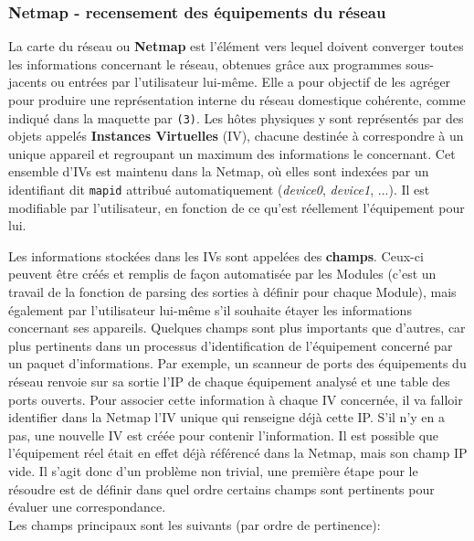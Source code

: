 \documentclass[]{article}
\begin{document}
\newpage

\subsubsection{Netmap - recensement des équipements du réseau}

La carte du réseau ou \textbf{Netmap} est l'élément vers lequel doivent converger toutes les informations concernant le réseau, obtenues grâce aux programmes sous-jacents ou entrées par l'utilisateur lui-même. Elle a pour objectif de les agréger pour produire une représentation interne du réseau domestique cohérente, comme indiqué dans la maquette par \texttt{(3)}. Les hôtes physiques y sont représentés par des objets appelés \textbf{Instances Virtuelles} (IV), chacune destinée à correspondre à un unique appareil et regroupant un maximum des informations le concernant. Cet ensemble d'IVs est maintenu dans la Netmap, où elles sont indexées par un identifiant dit \texttt{mapid} attribué automatiquement (\textit{device0}, \textit{device1}, ...). Il est modifiable par l'utilisateur, en fonction de ce qu'est réellement l'équipement pour lui.\\

\par Les informations stockées dans les IVs sont appelées des \textbf{champs}. Ceux-ci peuvent être créés et remplis de façon automatisée par les Modules (c'est un travail de la fonction de parsing des sorties à définir pour chaque Module), mais également par l'utilisateur lui-même s'il souhaite étayer les informations concernant ses appareils. Quelques champs sont plus importants que d'autres, car plus pertinents dans un processus d'identification de l'équipement concerné par un paquet d'informations. Par exemple, un scanneur de ports des équipements du réseau renvoie sur sa sortie l'IP de chaque équipement analysé et une table des ports ouverts. Pour associer cette information à chaque IV concernée, il va falloir identifier dans la Netmap l'IV unique qui renseigne déjà cette IP. S'il n'y en a pas, une nouvelle IV est créée pour contenir l'information. Il est possible que l'équipement réel était en effet déjà référencé dans la Netmap, mais son champ IP vide. Il s'agit donc d'un problème non trivial, une première étape pour le résoudre est de définir dans quel ordre certains champs sont pertinents pour évaluer une correspondance.\\

Les champs principaux sont les suivants (par ordre de pertinence):
\end{document}
